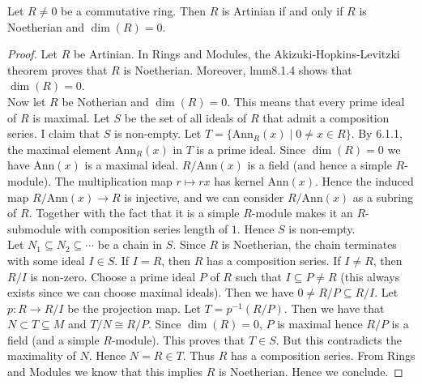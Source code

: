 \documentclass[a4paper]{article}
\begin{document}
\begin{prp}{}{} Let $R\neq 0$ be a commutative ring. Then $R$ is Artinian if and only if $R$ is Noetherian and $\dim(R)=0$. 
\begin{proof}
Let $R$ be Artinian. In Rings and Modules, the Akizuki-Hopkins-Levitzki theorem proves that $R$ is Noetherian. Moreover, lmm8.1.4 shows that $\dim(R)=0$. \\

Now let $R$ be Notherian and $\dim(R)=0$. This means that every prime ideal of $R$ is maximal. Let $S$ be the set of all ideals of $R$ that admit a composition series. I claim that $S$ is non-empty. Let $T=\{\text{Ann}_R(x)\;|\;0\neq x\in R\}$. By 6.1.1, the maximal element $\text{Ann}_R(x)$ in $T$ is a prime ideal. Since $\dim(R)=0$ we have $\text{Ann}(x)$ is a maximal ideal. $R/\text{Ann}(x)$ is a field (and hence a simple $R$-module). The multiplication map $r\mapsto rx$ has kernel $\text{Ann}(x)$. Hence the induced map $R/\text{Ann}(x)\to R$ is injective, and we can consider $R/\text{Ann}(x)$ as a subring of $R$. Together with the fact that it is a simple $R$-module makes it an $R$-submodule with composition series length of $1$. Hence $S$ is non-empty. \\

Let $N_1\subseteq N_2\subseteq\cdots$ be a chain in $S$. Since $R$ is Noetherian, the chain terminates with some ideal $I\in S$. If $I=R$, then $R$ has a composition series. If $I\neq R$, then $R/I$ is non-zero. Choose a prime ideal $P$ of $R$ such that $I\subseteq P\neq R$ (this always exists since we can choose maximal ideals). Then we have $0\neq R/P\subseteq R/I$. Let $p:R\to R/I$ be the projection map. Let $T=p^{-1}(R/P)$. Then we have that $N\subset T\subseteq M$ and $T/N\cong R/P$. Since $\dim(R)=0$, $P$ is maximal hence $R/P$ is a field (and a simple $R$-module). This proves that $T\in S$. But this contradicts the maximality of $N$. Hence $N=R\in T$. Thus $R$ has a composition series. From Rings and Modules we know that this implies $R$ is Noetherian. Hence we conclude. 
\end{proof}
\end{prp}
\end{document}
